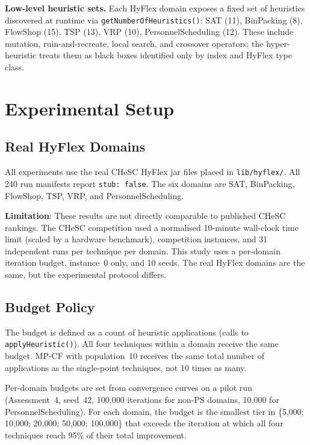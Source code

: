 \documentclass[11pt,a4paper]{article}
\begin{document}
\textbf{Low-level heuristic sets.}
Each HyFlex domain exposes a fixed set of heuristics discovered at runtime
via \texttt{getNumberOfHeuristics()}: SAT (11), BinPacking (8), FlowShop (15),
TSP (13), VRP (10), PersonnelScheduling (12). These include mutation,
ruin-and-recreate, local search, and crossover operators; the hyper-heuristic
treats them as black boxes identified only by index and HyFlex type class.

\section{Experimental Setup}

\subsection{Real HyFlex Domains}

All experiments use the real CHeSC HyFlex jar files placed in
\texttt{lib/hyflex/}. All 240 run manifests report \texttt{stub:~false}.
The six domains are SAT, BinPacking, FlowShop, TSP, VRP, and
PersonnelScheduling.

\textbf{Limitation}: These results are not directly comparable to published CHeSC
rankings. The CHeSC competition used a normalised 10-minute wall-clock time limit
(scaled by a hardware benchmark), competition instances, and 31 independent runs per
technique per domain. This study uses a per-domain iteration budget, instance~0 only,
and 10 seeds. The real HyFlex domains are the same, but the experimental protocol
differs.

\subsection{Budget Policy}

The budget is defined as a count of heuristic applications (calls to
\texttt{applyHeuristic()}). All four techniques within a domain receive the same
budget. MP-CF with population~10 receives the same total number of applications as
the single-point techniques, not 10 times as many.

Per-domain budgets are set from convergence curves on a pilot run (Assessment~4,
seed~42, 100{,}000 iterations for non-PS domains, 10{,}000 for PersonnelScheduling).
For each domain, the budget is the smallest tier in
\{5{,}000; 10{,}000; 20{,}000; 50{,}000; 100{,}000\} that exceeds the iteration at
which all four techniques reach 95\% of their total improvement.
\end{document}
